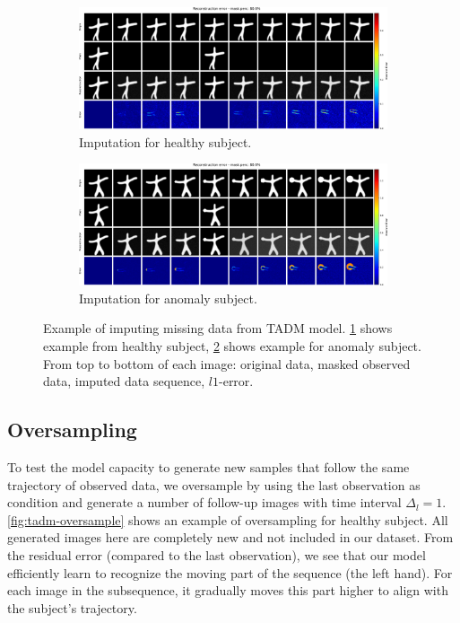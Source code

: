 \begin{figure}[htbp]
    \centering
    \begin{subfigure}{0.68\textwidth}
        \centering
        \includegraphics[width=1.0\linewidth]{figures/tadm-impute-healthy.pdf}
        \caption{Imputation for healthy subject.}
        \label{fig:tadm-impute-healthy}
    \end{subfigure}
    \hfill
    \begin{subfigure}{0.68\textwidth}
        \centering
        \includegraphics[width=1.0\linewidth]{figures/tadm-impute-gcircle.pdf}
        \caption{Imputation for anomaly subject.}
        \label{fig:tadm-impute-gcircle}
    \end{subfigure}
    \caption[Example imputation of missing data sequences using TDM]{Example of imputing missing data from TADM model. \cref{fig:tadm-impute-healthy} shows example from healthy subject, \cref{fig:tadm-impute-gcircle} shows example for anomaly subject. From top to bottom of each image: original data, masked observed data, imputed data sequence, $l1$-error.}
    \label{fig:tadm-impute-error}
\end{figure}

\subsection{Oversampling}

To test the model capacity to generate new samples that follow the same trajectory of observed data, we oversample by using the last observation as condition and generate a number of follow-up images with time interval $\Delta_l = 1$. \cref{fig:tadm-oversample} shows an example of oversampling for healthy subject. All generated images here are completely new and not included in our dataset. From the residual error (compared to the last observation), we see that our model efficiently learn to recognize the moving part of the sequence (the left hand). For each image in the subsequence, it gradually moves this part higher to align with the subject's trajectory.

